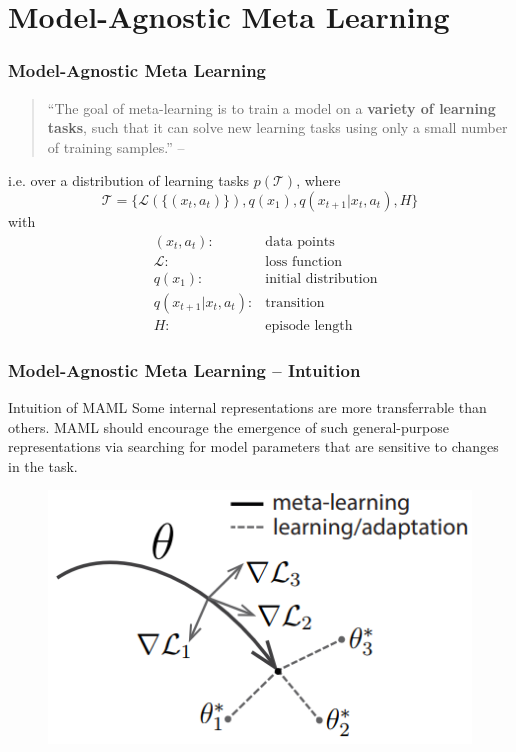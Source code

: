 
\section[MAML]{Model-Agnostic Meta Learning}


\begin{frame}
\frametitle{Model-Agnostic Meta Learning}

\begin{quote}
    ``The goal of meta-learning is to train a model on a {\bfseries variety of {\color{red} learning tasks}}, such that it can solve new learning tasks using only a small number of training samples.'' \hfill -- \cite{finn2017maml}
\end{quote}

\vspace{0.6em}

i.e. over a distribution of learning tasks $p(\mathcal{T})$, where
$$\mathcal{T} = \{ \mathcal{L}(\{(x_t,a_t)\}), q(x_1), q(x_{t+1}|x_t, a_t), H \}$$
with
\begin{align*}
    & (x_t,a_t): & \text{data points} \\
    & \mathcal{L}: & \text{loss function} \\
    & q(x_1): & \text{initial distribution} \\
    & q(x_{t+1}|x_t, a_t): & \text{transition} \\
    & H: & \text{episode length}
\end{align*}

\end{frame}


\begin{frame}
\frametitle{Model-Agnostic Meta Learning -- Intuition}

\begin{block}{Intuition of MAML}
Some internal representations are more transferrable than others. MAML should encourage the emergence of such general-purpose representations via searching for model parameters that are sensitive to changes in the task.
\end{block}

\begin{figure}
    \centering
    \includegraphics[keepaspectratio,width=.65\textwidth]{images/maml.png}
\end{figure}

\end{frame}


